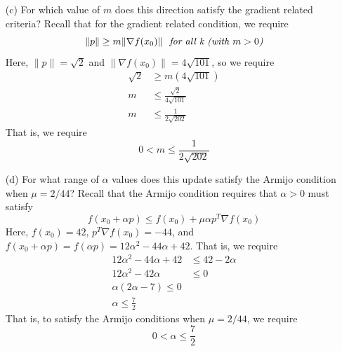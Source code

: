 \documentclass{article}
\begin{document}
\begin{itemize}
\begin{itemize}
        \item[(c)] For which value of $m$ does this direction satisfy the gradient related criteria?
        \newline\newline
        Recall that for the gradient related condition, we require
        \[\|p\| \geq m\|\nabla f(x_0)\| \hspace{0.7em} \textit{for all k (with $m > 0$)}\]
        Here, $\|p\| = \sqrt{2}$ and $\|\nabla f(x_0) \| = 4\sqrt{101}$, so we require
        \begin{align*}
            \sqrt{2} &\geq m(4\sqrt{101})\\
            m &\leq \frac{\sqrt{2}}{4\sqrt{101}}\\
            m &\leq \frac{1}{2\sqrt{202}}
        \end{align*}
        That is, we require
        \[0 < m \leq \frac{1}{2\sqrt{202}}\]

        \item[(d)] For what range of $\alpha$ values does this update satisfy the Armijo condition when $\mu = 2/44$?
        \newline\newline
        Recall that the Armijo condition requires that $\alpha > 0$ must satisfy
        \[f(x_0 + \alpha p) \leq f(x_0) + \mu \alpha p^T\nabla f(x_0)\]
        Here, $f(x_0) = 42$, $p^T\nabla f(x_0) = -44$, and $f(x_0 + \alpha p) = f(\alpha p) = 12\alpha^2 - 44\alpha + 42$. That is, we require
        \begin{align*}
            12\alpha^2 - 44\alpha + 42 &\leq 42 - 2\alpha\\
            12\alpha^2 - 42\alpha &\leq 0\\
            \alpha(2\alpha - 7) \leq 0\\
            \alpha \leq \frac{7}{2}
        \end{align*}
        That is, to satisfy the Armijo conditions when $\mu = 2/44$, we require
        \[0 < \alpha \leq \frac{7}{2}\]
        


\end{itemize}
\end{itemize}
\end{document}

